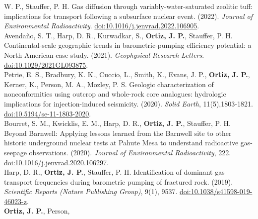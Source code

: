 \documentclass[11pt, letterpaper]{article}
\newcommand{\years}[1]{\marginnote{\scriptsize #1}}
\begin{document}
W. P., Stauffer, P. H. Gas diffusion through variably-water-saturated zeolitic
tuff: implications for transport following a subsurface nuclear event. (2022).
\emph{Journal of Environmental Radioactivity}.
\href{https://www.sciencedirect.com/science/article/pii/S0265931X22000959/pdfft?md5=9a2aafb80eab7a1daa481601c5af9247&pid=1-s2.0-S0265931X22000959-main.pdf}{doi:10.1016/j.jenvrad.2022.106905}.
\JournalofEnvironmentOOOOGasdiffusionthroughv\\
%
\years{2021}Avendaño, S. T., Harp, D. R., Kurwadkar, S., \textbf{Ortiz, J.
P.}, Stauffer, P. H. Continental-scale geographic trends in barometric-pumping
efficiency potential: a North American case study. (2021). 
\emph{Geophysical Research Letters}.  
\href{https://agupubs.onlinelibrary.wiley.com/doi/pdf/10.1029/2021GL093875}{doi:10.1029/2021GL093875}.
\GeophysicalResearchLOOOOContinentalScaleGeog\\
%
\years{2020}Petrie, E. S., Bradbury, K. K., Cuccio, L., Smith, K., Evans, J.
P., \textbf{Ortiz, J. P.}, Kerner, K., Person, M. A., Mozley, P. S.
Geologic characterization of nonconformities using outcrop and whole-rock core
analogues: hydrologic implications for injection-induced seismicity. (2020).
\emph{Solid Earth}, 11(5),1803-1821. 
\href{https://se.copernicus.org/articles/11/1803/2020/se-11-1803-2020.pdf}{doi:10.5194/se-11-1803-2020}.
\SolidEarthOOOOGeologiccharacteriza\\
%
\years{2020}Bourret, S. M., Kwicklis, E. M., Harp, D. R., \textbf{Ortiz, J.
P.}, Stauffer, P. H. Beyond Barnwell: Applying lessons learned from the
Barnwell site to other historic underground nuclear tests at Pahute Mesa to
understand radioactive gas-seepage observations. (2020). \emph{Journal of Environmental
Radioactivity}, 222. 
\href{https://www.sciencedirect.com/science/article/pii/S0265931X20300199/pdfft?md5=63166f84895846446b3a9ce93cc68c79&pid=1-s2.0-S0265931X20300199-main.pdf}{doi:10.1016/j.jenvrad.2020.106297}.
\JournalofEnvironmentOOOOBeyondBarnwellApplyi\\
%
\years{2019}Harp, D. R., \textbf{Ortiz, J. P.}, Stauffer, P. H. Identification
of dominant gas transport frequencies during barometric pumping of fractured
rock. (2019). \emph{Scientific Reports (Nature Publishing Group)}, 9(1), 9537.
\href{https://www.nature.com/articles/s41598-019-46023-z.pdf}{doi:10.1038/s41598-019-46023-z}.
\ScientificReportsOOOOIdentificationofdomi\\ 
%
\years{2019}\textbf{Ortiz, J. P.}, Person,
\end{document}
